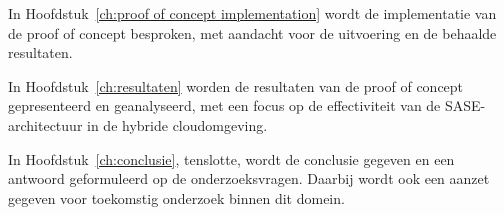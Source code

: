 In Hoofdstuk~\ref{ch:proof of concept implementation} wordt de implementatie van de proof of concept besproken, met aandacht voor de uitvoering en de behaalde resultaten.

\vspace{2ex}

In Hoofdstuk~\ref{ch:resultaten} worden de resultaten van de proof of concept gepresenteerd en geanalyseerd, met een focus op de effectiviteit van de SASE-architectuur in de hybride cloudomgeving.

\vspace{2ex}

In Hoofdstuk~\ref{ch:conclusie}, tenslotte, wordt de conclusie gegeven en een antwoord geformuleerd op de onderzoeksvragen. Daarbij wordt ook een aanzet gegeven voor toekomstig onderzoek binnen dit domein.